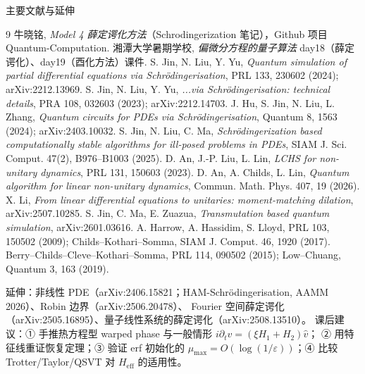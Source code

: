 \documentclass[aspectratio=169,9pt]{ctexbeamer}
\newcommand{\eps}{\varepsilon}
\begin{document}
\begin{frame}{主要文献与延伸}
\scriptsize
\begin{thebibliography}{9}
 牛晓铭, \emph{Model 4 薛定谔化方法}（Schrodingerization 笔记），Github 项目 Quantum-Computation.
 湘潭大学暑期学校, \emph{偏微分方程的量子算法} day18（薛定谔化）、day19（酉化方法）课件.
 S. Jin, N. Liu, Y. Yu, \emph{Quantum simulation of partial differential equations via Schrödingerisation}, PRL 133, 230602 (2024); arXiv:2212.13969.
 S. Jin, N. Liu, Y. Yu, \emph{...via Schrödingerisation: technical details}, PRA 108, 032603 (2023); arXiv:2212.14703.
 J. Hu, S. Jin, N. Liu, L. Zhang, \emph{Quantum circuits for PDEs via Schrödingerisation}, Quantum 8, 1563 (2024); arXiv:2403.10032.
 S. Jin, N. Liu, C. Ma, \emph{Schrödingerization based computationally stable algorithms for ill-posed problems in PDEs}, SIAM J. Sci. Comput. 47(2), B976--B1003 (2025).
 D. An, J.-P. Liu, L. Lin, \emph{LCHS for non-unitary dynamics}, PRL 131, 150603 (2023).
 D. An, A. Childs, L. Lin, \emph{Quantum algorithm for linear non-unitary dynamics}, Commun. Math. Phys. 407, 19 (2026).
 X. Li, \emph{From linear differential equations to unitaries: moment-matching dilation}, arXiv:2507.10285.
 S. Jin, C. Ma, E. Zuazua, \emph{Transmutation based quantum simulation}, arXiv:2601.03616.
 A. Harrow, A. Hassidim, S. Lloyd, PRL 103, 150502 (2009); Childs--Kothari--Somma, SIAM J. Comput. 46, 1920 (2017).
 Berry--Childs--Cleve--Kothari--Somma, PRL 114, 090502 (2015); Low--Chuang, Quantum 3, 163 (2019).
\end{thebibliography}
\vspace{1mm}
{\tiny\color{graytext}延伸：非线性 PDE（arXiv:2406.15821；HAM-Schrödingerisation, AAMM 2026）、Robin 边界（arXiv:2506.20478）、
Fourier 空间薛定谔化（arXiv:2505.16895）、量子线性系统的薛定谔化（arXiv:2508.13510）。
课后建议：① 手推热方程型 warped phase 与一般情形 $i\partial_t\hat v=(\xi H_1+H_2)\hat v$；
② 用特征线重证恢复定理；③ 验证 erf 初始化的 $\mu_{\max}=O(\log(1/\eps))$；④ 比较 Trotter/Taylor/QSVT 对 $H_{\mathrm{eff}}$ 的适用性。}
\end{frame}
\end{document}
